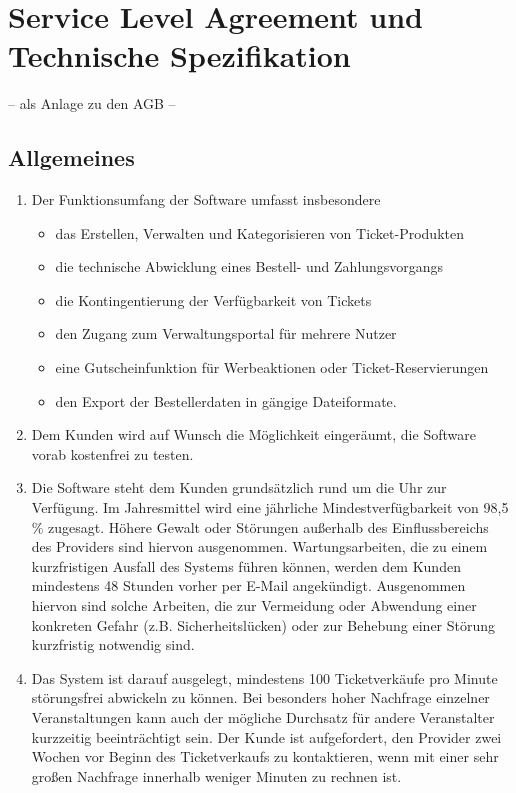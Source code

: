 \documentclass{terms}
\begin{document}
\newpage
\section{Service Level Agreement und Technische Spezifikation}
\vspace*{-3mm}
\begin{center}– als Anlage zu den AGB –\end{center}
\vspace*{-3mm}

\subsection{Allgemeines}
\begin{enumerate}
\item Der Funktionsumfang der Software umfasst insbesondere \begin{itemize}
\item das Erstellen, Verwalten und Kategorisieren von Ticket-Produkten 
\item die technische Abwicklung eines Bestell- und Zahlungsvorgangs 
\item die Kontingentierung der Verfügbarkeit von Tickets 
\item den Zugang zum Verwaltungsportal für mehrere Nutzer 
\item eine Gutscheinfunktion für Werbeaktionen oder Ticket-Reservierungen 
\item den Export der Bestellerdaten in gängige Dateiformate.
\end{itemize}
\item Dem Kunden wird auf Wunsch die Möglichkeit eingeräumt, die Software vorab kostenfrei zu testen.
\item Die Software steht dem Kunden grundsätzlich rund um die Uhr zur Verfügung. Im Jahresmittel wird eine jährliche Mindestverfügbarkeit von 98,5 \% zugesagt. Höhere Gewalt oder Störungen außerhalb des Einflussbereichs des Providers sind hiervon ausgenommen. Wartungsarbeiten, die zu einem kurzfristigen Ausfall des Systems führen können, werden dem Kunden mindestens 48 Stunden vorher per E-Mail angekündigt. Ausgenommen hiervon sind solche Arbeiten, die zur Vermeidung oder Abwendung einer konkreten Gefahr (z.B. Sicherheitslücken) oder zur Behebung einer Störung kurzfristig notwendig sind.
\item Das System ist darauf ausgelegt, mindestens 100 Ticketverkäufe pro Minute störungsfrei abwickeln zu können. Bei besonders hoher Nachfrage einzelner Veranstaltungen kann auch der mögliche Durchsatz für andere Veranstalter kurzzeitig beeinträchtigt sein. Der Kunde ist aufgefordert, den Provider zwei Wochen vor Beginn des Ticketverkaufs zu kontaktieren, wenn mit einer sehr großen Nachfrage innerhalb weniger Minuten zu rechnen ist.

\end{enumerate}
\end{document}
